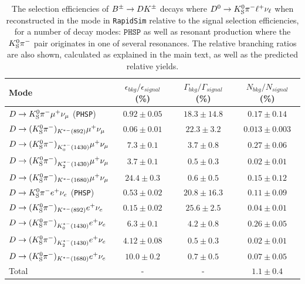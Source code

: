 \begin{table}
    \centering
    \caption{The selection efficiencies of ${{B}^\pm}\rightarrow{\ensuremath{D}}{\ensuremath{{K}^\pm}}$ decays where ${{D}^0}\rightarrow{\ensuremath{{K}^0_{\mathrm{S}}}}{\ensuremath{{\pi}^-}}\ell^+\nu_\ell$ when reconstructed in the \DtoKspipi mode in \texttt{RapidSim} relative to the signal selection efficiencies, for a number of decay modes: $\texttt{PHSP}$ as well as resonant production where the ${{K}^0_{\mathrm{S}}}{{\pi}^-}$ pair originates in one of several \Kstar resonances. The relative branching ratios are also shown, calculated as explained in the main text, as well as the predicted relative yields.
    \label{tab:relative_d2ksellnu_yields}}
    \begin{tabular}{l |cc|c}
    \toprule
    Mode & $\epsilon_{bkg}/\epsilon_{signal}$ (\%)& $\Gamma_{bkg}/\Gamma_{signal}$ (\%)& $N_{bkg}/N_{signal}$ (\%)\\
    \midrule

    ${D}\rightarrow{\ensuremath{{K}^0_{\mathrm{S}}}}{\ensuremath{{\pi}^-}}\mu^+\nu_{\mu}$ (\texttt{PHSP})     & $0.92 \pm 0.05$ & $18.3 \pm 14.8$ & $0.17 \pm 0.14$\\
    ${D}\rightarrow ({{K}^0_{\mathrm{S}}}{{\pi}^-})_{K^{*-}(892)}\mu^+\nu_{\mu}$    & $0.06\pm0.01$ & $22.3\pm 3.2$ & $0.013 \pm 0.003$ \\
    ${D}\rightarrow ({{K}^0_{\mathrm{S}}}{{\pi}^-})_{K^{*-}_0(1430)}\mu^+\nu_{\mu}$ & $7.3 \pm 0.1$ & $3.7 \pm 0.8$ & $0.27 \pm 0.06   $\\
    ${D}\rightarrow ({{K}^0_{\mathrm{S}}}{{\pi}^-})_{K^{*-}_2(1430)}\mu^+\nu_{\mu}$ & $3.7 \pm 0.1$ & $0.5 \pm 0.3$ & $0.02 \pm 0.01$   \\
    ${D}\rightarrow ({{K}^0_{\mathrm{S}}}{{\pi}^-})_{K^{*-}(1680)}\mu^+\nu_{\mu}$   & $24.4 \pm 0.3$ & $0.6 \pm 0.5$ & $0.15 \pm 0.12$\\
    \midrule
    ${D}\rightarrow{\ensuremath{{K}^0_{\mathrm{S}}}}{\ensuremath{{\pi}^-}} e^+\nu_{e}$ (\texttt{PHSP})       & $0.53\pm0.02$ & $20.8\pm16.3$ & $0.11 \pm 0.09$\\
    ${D}\rightarrow ({{K}^0_{\mathrm{S}}}{{\pi}^-})_{K^{*-}(892)} e^+\nu_{e}$      & $0.15\pm0.02$ & $25.6 \pm 2.5$ & $0.04 \pm 0.01$\\
    ${D}\rightarrow ({{K}^0_{\mathrm{S}}}{{\pi}^-})_{K^{*-}_0(1430)} e^+\nu_{e}$   & $6.3 \pm 0.1$ & $4.2\pm0.8$ & $0.26\pm0.05$\\
    ${D}\rightarrow ({{K}^0_{\mathrm{S}}}{{\pi}^-})_{K^{*-}_2(1430)} e^+\nu_{e}$   & $4.12 \pm 0.08$ & $0.5 \pm 0.3$ & $0.02\pm0.01$\\
    ${D}\rightarrow ({{K}^0_{\mathrm{S}}}{{\pi}^-})_{K^{*-}(1680)} e^+\nu_{e}$     & $10.0 \pm 0.2$ & $0.7 \pm 0.5$ & $0.07\pm0.05$\\
    \midrule
    Total & - & - & $1.1\pm0.4$\\
    \bottomrule
    \end{tabular}
\end{table}

